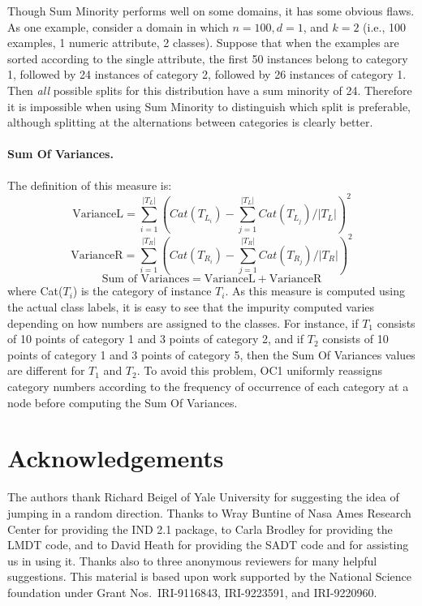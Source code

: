 Though Sum Minority performs well on some domains, it has some obvious
flaws.  As one example, consider a domain in which $n=100,d=1$, and
$k=2$ (i.e., 100 examples, 1 numeric attribute, 2 classes).  Suppose
that when the examples are sorted according to the single attribute,
the first 50 instances belong to category 1, followed by 24 instances
of category 2, followed by 26 instances of category 1.  Then {\em all}
possible splits for this distribution have a sum minority of 24.
Therefore it is impossible when using Sum Minority to distinguish
which split is preferable, although splitting at the alternations
between categories is clearly better.

\paragraph{Sum Of Variances.}
The definition of this measure is:
\[ \mbox{VarianceL} = \sum_{i=1}^{|T_L|} {(Cat(T_{L_i}) - 
		   \sum_{j=1}^{|T_L|} Cat(T_{L_j}) / |T_L|)^2}\]
\[ \mbox{VarianceR} = \sum_{i=1}^{|T_R|} {(Cat(T_{R_i}) - 
		   \sum_{j=1}^{|T_R|} Cat(T_{R_j}) / |T_R|)^2}\]
\[ \mbox{Sum of Variances} = \mbox{VarianceL} + \mbox{VarianceR} \]
where Cat($T_i$) is the category of instance $T_i$.  As this measure
is computed using the actual class labels, it is easy to see that the
impurity computed varies depending on how numbers are assigned to the
classes.  For instance, if $T_1$ consists of 10 points of category 1
and 3 points of category 2, and if $T_2$ consists of 10 points of
category 1 and 3 points of category 5, then the Sum Of Variances
values are different for $T_1$ and $T_2$.  To avoid this problem, OC1
uniformly reassigns category numbers according to the frequency of
occurrence of each category at a node before computing the Sum Of
Variances.

\section*{Acknowledgements}
The authors thank Richard Beigel of Yale University for suggesting the
idea of jumping in a random direction.  Thanks to Wray Buntine of Nasa
Ames Research Center for providing the IND 2.1 package, to Carla
Brodley for providing the LMDT code, and to David Heath for providing
the SADT code and for assisting us in using it.  Thanks also to three
anonymous reviewers for many helpful suggestions.  This material is
based upon work supported by the National Science foundation under
Grant Nos.\ IRI-9116843, IRI-9223591, and IRI-9220960.


